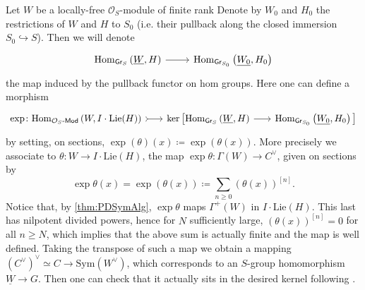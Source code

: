\documentclass[../Main]{subfiles}
\begin{document}
\begin{defn}
	Let $W$ be a locally-free $\mathcal{O}_{ S }$-module of finite rank
	Denote by $W_0$ and $H_0$ the restrictions of $W$ and $H$ to 
	$S_0$ (i.e. their pullback along
	the closed immersion $S_0 \hookrightarrow S$).
	Then we will denote
	\begin{equation*}
	\begin{tikzcd}[row sep = 0ex
		,/tikz/column 1/.append style={anchor=base east}
		,/tikz/column 2/.append style={anchor=base west}]
		\mathrm{Hom}_{ \mathsf{Gr}_S } 
		\left( \underline{W}, H \right)
		\arrow[r, "", rightarrow] &
		\mathrm{Hom}_{ \mathsf{Gr}_{S_0} }
		\left( \underline{W_0}, H_0 \right)
	\end{tikzcd}
	\end{equation*} 
	the map induced by the pullback functor on hom groups.
	Here one can define a morphism
	\begin{equation*}
	\begin{tikzcd}[row sep = 0ex, column sep = 1.8em
		,/tikz/column 1/.append style={anchor=base east}
		,/tikz/column 2/.append style={anchor=base west}]
		\exp\colon
		\mathrm{Hom}_{ \mathcal{O}_{ S }\text{-}\mathsf{Mod} }
		\left( W, I \cdot \mathrm{Lie}(H) \right)
		\arrow[r, "", rightarrowtail] &
		\ker \big[ 
		\mathrm{Hom}_{ \mathsf{Gr}_S } 
		\left( \underline{W}, H \right)
		\arrow[r, "", rightarrow] &
		\mathrm{Hom}_{ \mathsf{Gr}_{S_0} }
		\left( \underline{W_0}, H_0 \right)
		\big]
	\end{tikzcd}
	\end{equation*} 
	by setting, on sections,
	$\exp (\theta) (x) \coloneqq \exp \left( \theta(x) \right)$.
	More precisely we associate to $\theta\colon W \to I \cdot \mathrm{Lie}(H)$,
	the map $\exp \theta\colon \Gamma(W) \to C^\vee$, given on sections by
	\begin{equation*}
	\exp \theta (x) =
	\exp \left( \theta(x) \right) \coloneqq
	\sum_{n\geq 0 } (\theta(x))^{[n]}
	.\end{equation*}
	Notice that, by \cref{thm:PDSymAlg}, $\exp \theta$
	maps $\Gamma^+(W)$ in $I \cdot \mathrm{Lie}(H)$.
	This last has nilpotent divided powers, hence for $N$ sufficiently
	large, $(\theta(x))^{[n]} = 0$ for all $n \geq N$,
	which implies that the above sum is actually finite
	and the map is well defined.
	Taking the transpose of such a map we obtain a mapping 
	$(C^\vee)^\vee \simeq C \to \mathrm{Sym}(W^\vee)$, which corresponds
	to an $S$-group homomorphism $\underline{W} \to G$.
	Then one can check that it actually sits in the desired kernel
	following \cite[Chapter III, \S2.4, 2.6]{Messing}.
\end{defn}
\end{document}
